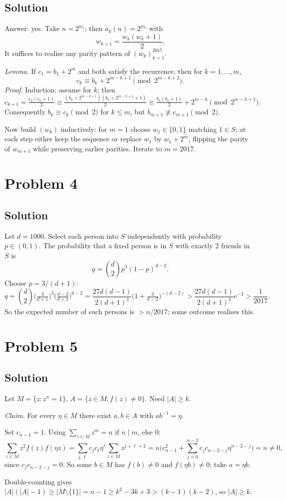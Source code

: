 \documentclass{article}
\begin{document}
\subsection*{Solution}
Answer: yes. Take $n = 2^{w_1}$; then $a_k(n) = 2^{w_k}$ with
\[ w_{k+1} = \frac{w_k(w_k+1)}{2}. \]
It suffices to realise any parity pattern of $(w_k)_{k=1}^{2017}$.

\emph{Lemma.} If $c_1 = b_1 + 2^m$ and both satisfy the recurrence, then for $k = 1, \dots, m$,
\[ c_k \equiv b_k + 2^{m-k+1} \pmod{2^{m-k+2}}. \]
\emph{Proof.} Induction: assume for $k$; then
\[ c_{k+1} = \tfrac{c_k(c_k+1)}{2} \equiv \tfrac{(b_k + 2^{m-k+1})(b_k + 2^{m-k+1}+1)}{2} \equiv \tfrac{b_k(b_k+1)}{2} + 2^{m-k} \pmod{2^{m-k+1}}. \]
Consequently $b_k \equiv c_k \pmod 2$ for $k \le m$, but $b_{m+1} \not\equiv c_{m+1} \pmod 2$.

Now build $(w_k)$ inductively: for $m=1$ choose $w_1 \in \{0,1\}$ matching $1 \in S$; at each step either keep the sequence or replace $w_1$ by $w_1 + 2^m$, flipping the parity of $w_{m+1}$ while preserving earlier parities. Iterate to $m = 2017$.

\section*{Problem 4}
\subsection*{Solution}
Let $d = 1000$. Select each person into $S$ independently with probability $p \in (0,1)$. The probability that a fixed person is in $S$ with exactly 2 friends in $S$ is
\[ q = \binom{d}{2} p^3 (1-p)^{d-2}. \]
Choose $p = 3/(d+1)$:
\[ q = \binom{d}{2} \Big(\tfrac{3}{d+1}\Big)^3 \Big(\tfrac{d-2}{d+1}\Big)^{d-2} = \frac{27 d(d-1)}{2(d+1)^3}\Big(1 + \tfrac{3}{d-2}\Big)^{-(d-2)} > \frac{27 d(d-1)}{2(d+1)^3} e^{-3} > \frac{1}{2017}. \]
So the expected number of such persons is $> n/2017$; some outcome realises this.

\section*{Problem 5}
\subsection*{Solution}
Let $M = \{z : z^n = 1\}$, $A = \{z \in M : f(z) \ne 0\}$. Need $|A| \ge k$.

\emph{Claim.} For every $\eta \in M$ there exist $a, b \in A$ with $a b^{-1} = \eta$.

Set $c_{n-1} = 1$. Using $\sum_{z \in M} z^m = n$ if $n \mid m$, else $0$:
\[ \sum_{z \in M} z^2 f(z) f(\eta z) = \sum_{j,\ell} c_j c_\ell \eta^\ell \sum_{z \in M} z^{j+\ell+2} = n\Big(c_{n-1}^2 + \sum_{j=0}^{n-2} c_j c_{n-2-j} \eta^{n-2-j}\Big) = n \ne 0, \]
since $c_j c_{n-2-j} = 0$. So some $b \in M$ has $f(b) \ne 0$ and $f(\eta b) \ne 0$; take $a = \eta b$.

Double-counting gives $|A|(|A|-1) \ge |M \setminus \{1\}| = n - 1 \ge k^2 - 3k + 3 > (k-1)(k-2)$, so $|A| \ge k$.
\end{document}

